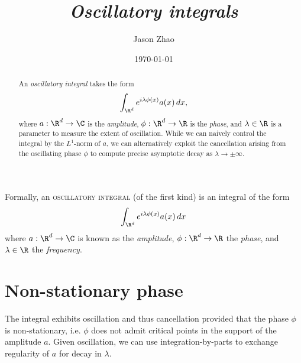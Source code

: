 \documentclass[reqno]{amsart}
\title
{
	\emph{Oscillatory integrals}
}
\author{Jason Zhao}
\date{\today}
\theoremstyle{definition}
\theoremstyle{remark}
\renewcommand{\emph}{\textsc}
\begin{document}
\maketitle

\begin{abstract}
	An \textit{oscillatory integral} takes the form 
		\[ \int_{\R^d} e^{i \lambda \phi(x)} a(x) \, dx, \]
	where $a : \R^d \to \C$ is the \textit{amplitude}, $\phi : \R^d \to \R$ is the \textit{phase}, and $\lambda \in \R$ is a parameter to measure the extent of oscillation. While we can naively control the integral by the $L^1$-norm of $a$, we can alternatively exploit the cancellation arising from the oscillating phase $\phi$ to compute precise asymptotic decay as $\lambda \to \pm \infty$.  
\end{abstract}

\tableofcontents

Formally, an \emph{oscillatory integral} (of the first kind) is an integral of the form
	\[ \int_{\R^d} e^{i \lambda \phi(x)} a(x) \, dx \]
where $a : \R^d \to \C$ is known as the \textit{amplitude}, $\phi : \R^d \to \R$ the \textit{phase}, and $\lambda \in \R$ the \textit{frequency}. 


\section{Non-stationary phase}

The integral exhibits oscillation and thus cancellation provided that the phase $\phi$ is non-stationary, i.e. $\phi$ does not admit critical points in the support of the amplitude $a$. Given oscillation, we can use integration-by-parts to exchange regularity of $a$ for decay in $\lambda$. 
\end{document}
